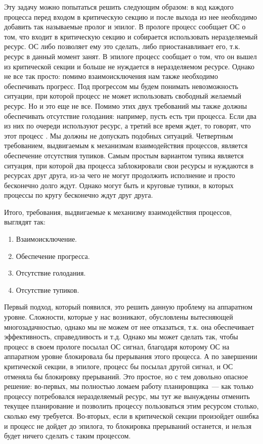 Эту задачу можно попытаться решить следующим образом: в код каждого процесса
перед входом в критическую секцию и после выхода из нее необходимо добавить так
называемые пролог и эпилог. В прологе процесс сообщает ОС о том, что входит в
критическую секцию и собирается использовать неразделяемый ресурс. ОС либо
позволяет ему это сделать, либо приостанавливает его, т.к. ресурс в данный
момент занят. В эпилоге процесс сообщает о том, что он вышел из критической
секции и больше не нуждается в неразделяемом ресурсе. Однако не все так просто:
помимо взаимоисключения нам также необходимо обеспечивать прогресс. Под
прогрессом мы будем понимать невозможность ситуации, при которой процесс не
может использовать свободный желаемый ресурс. Но и это еще не все. Помимо этих
двух требований мы также должны обеспечивать отсутствие голодания: например,
пусть есть три процесса. Если два из них по очереди используют ресурс, а третий
все время ждет, то говорят, что этот процесс . Мы должны не
допускать подобных ситуаций. Четвертным требованием, выдвигаемым к механизмам
взаимодействия процессов, является обеспечение отсутствия тупиков. Самым простым
вариантом тупика является ситуация, при которой два процесса заблокировали свои
ресурсы и нуждаются в ресурсах друг друга, из-за чего не могут продолжить
исполнение и просто бесконечно долго ждут. Однако могут быть и круговые тупики,
в которых процессы по кругу бесконечно ждут друг друга.

Итого, требования, выдвигаемые к механизму взаимодействия процессов, выглядят
так:

\begin{enumerate}
\item
  Взаимоисключение.

\item
  Обеспечение прогресса.

\item
  Отсутствие голодания.

\item
  Отсутствие тупиков.
\end{enumerate}

Первый подход, который появился, это решить данную проблему на аппаратном
уровне. Сложности, которые у нас возникают, обусловлены вытесняющей
многозадачностью, однако мы не можем от нее отказаться, т.к. она обеспечивает
эффективность, справедливость и т.д. Однако мы может сделать так, чтобы процесс
в своем прологе посылал ОС сигнал, благодаря которому ОС на аппаратном уровне
блокировала бы прерывания этого процесса. А по завершении критической секции, в
эпилоге, процесс бы посылал другой сигнал, и ОС отменяла бы блокировку
прерываний. Это простое, но с тем довольно опасное решение: во-первых, мы
полностью ломаем работу планировщика~--- как только процессу потребовался
неразделяемый ресурс, мы тут же вынуждены отменить текущее планирование и
позволить процессу пользоваться этим ресурсом столько, сколько ему требуется.
Во-вторых, если в критической секции произойдет ошибка и процесс не дойдет до
эпилога, то блокировка прерываний останется, и нельзя будет ничего сделать с
таким процессом.

